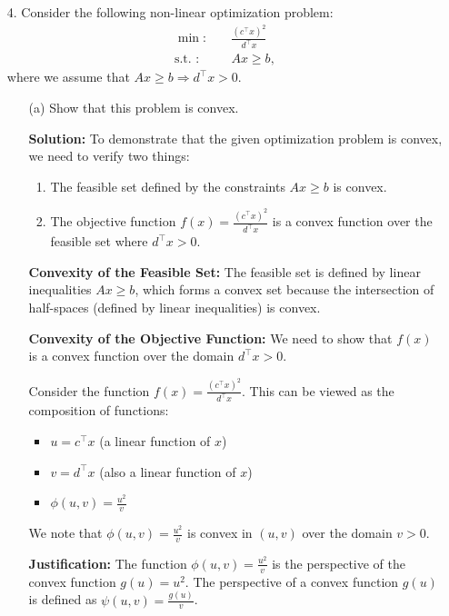 \documentclass{article}
\begin{document}
\begin{enumerate}
\item[4.] Consider the following non-linear optimization problem:
    \begin{align*}
    \min : &\quad \frac{(c^\top x)^2}{d^\top x} \\
    \text{s.t. : } &\quad Ax \geq b,
    \end{align*}
    where we assume that $Ax \geq b \Rightarrow d^\top x > 0$.

    \begin{enumerate}
    \item[(a)] Show that this problem is convex.
    
    \textbf{Solution:}
    To demonstrate that the given optimization problem is convex, we need to verify two things:
    \begin{enumerate}
        \item The feasible set defined by the constraints $Ax \geq b$ is convex.
        \item The objective function $f(x) = \frac{(c^\top x)^2}{d^\top x}$ is a convex function over the feasible set where $d^\top x > 0$.
    \end{enumerate}

    \textbf{Convexity of the Feasible Set:}
    The feasible set is defined by linear inequalities $Ax \geq b$, which forms a convex set because the intersection of half-spaces (defined by linear inequalities) is convex.

    \textbf{Convexity of the Objective Function:}
    We need to show that $f(x)$ is a convex function over the domain $d^\top x > 0$.

    Consider the function $f(x) = \frac{(c^\top x)^2}{d^\top x}$. This can be viewed as the composition of functions:
    \begin{itemize}
        \item $u = c^\top x$ (a linear function of $x$)
        \item $v = d^\top x$ (also a linear function of $x$)
        \item $\phi(u, v) = \frac{u^2}{v}$
    \end{itemize}

    We note that $\phi(u, v) = \frac{u^2}{v}$ is convex in $(u, v)$ over the domain $v > 0$.

    \textbf{Justification:}
    The function $\phi(u, v) = \frac{u^2}{v}$ is the perspective of the convex function $g(u) = u^2$. The perspective of a convex function $g(u)$ is defined as $\psi(u, v) = \frac{g(u)}{v}$.


\end{enumerate}
\end{enumerate}
\end{document}

